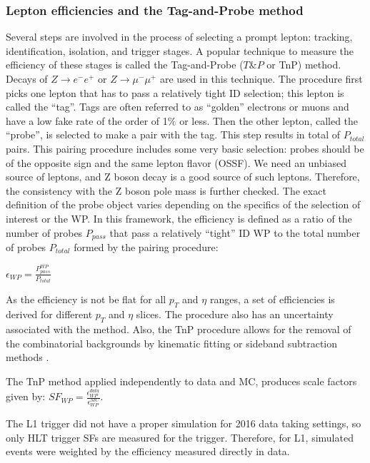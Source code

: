 \subsubsection{Lepton efficiencies and the Tag-and-Probe method}\label{sec:TnP}

Several steps are involved in the process of selecting a prompt lepton: tracking, identification, isolation, and trigger stages. A popular technique to measure the efficiency of these stages is called the Tag-and-Probe ($T\&P$ or TnP) method. Decays of $Z \rightarrow e^- e^+$ or $Z \rightarrow \mu^- \mu^+$ are used in this technique. The procedure first picks one lepton that has to pass a relatively tight ID selection; this lepton is called the ``tag''. Tags are often referred to as ``golden'' electrons or muons and have a low fake rate of the order of 1$\%$ or less. Then the other lepton, called the ``probe'', is selected to make a pair with the tag. This step results in total of $P_{total}$ pairs. This pairing procedure includes some very basic selection:  probes should be of the opposite sign and the same lepton flavor (OSSF). We need an unbiased source of leptons, and Z boson decay is a good source of such leptons. Therefore, the consistency with the Z boson pole mass is further checked. The exact definition of the probe object varies depending on the specifics of the selection of interest or the WP. In this framework, the efficiency is defined as a ratio of the number of probes $P_{pass}$ that pass a relatively ``tight'' ID WP to the total number of probes $P_{total}$ formed by the pairing procedure:

$\epsilon_{WP} = \frac{P^{WP} _{pass}}{P_{total}} $

As the efficiency is not be flat for all $p_T$ and $\eta$ ranges, a set of efficiencies is derived for different $p_T$ and $\eta$ slices. The procedure also has an uncertainty associated with the method. Also, the TnP procedure allows for the removal of the combinatorial backgrounds by kinematic fitting or sideband subtraction methods \cite{TnP}. 

The TnP method applied independently to data and MC, produces scale factors given by:
$SF_{WP} = \frac{\epsilon^{data}_{WP}}{\epsilon^{MC}_{WP}}$.

The L1 trigger did not have a proper simulation for 2016 data taking settings, so only HLT trigger SFs are measured for the trigger. Therefore, for L1, simulated events were weighted by the efficiency measured directly in data. 



